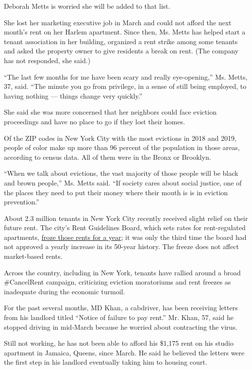 Deborah Metts is worried she will be added to that list.

She lost her marketing executive job in March and could not afford the
next month's rent on her Harlem apartment. Since then, Ms. Metts has
helped start a tenant association in her building, organized a rent
strike among some tenants and asked the property owner to give residents
a break on rent. (The company has not responded, she said.)

``The last few months for me have been scary and really eye-opening,''
Ms. Metts, 37, said. ``The minute you go from privilege, in a sense of
still being employed, to having nothing --- things change very
quickly.''

She said she was more concerned that her neighbors could face eviction
proceedings and have no place to go if they lost their homes.

Of the ZIP codes in New York City with the most evictions in 2018 and
2019, people of color make up more than 96 percent of the population in
those areas, according to census data. All of them were in the Bronx or
Brooklyn.

``When we talk about evictions, the vast majority of those people will
be black and brown people,'' Ms. Metts said. ``If society cares about
social justice, one of the places they need to put their money where
their mouth is is in eviction prevention.''

About 2.3 million tenants in New York City recently received slight
relief on their future rent. The city's Rent Guidelines Board, which
sets rates for rent-regulated apartments,
\href{https://www.nytimes.com/2020/06/17/nyregion/nyc-rent-guidelines-board-freeze.html}{froze
those rents for a year}; it was only the third time the board had not
approved a yearly increase in its 50-year history. The freeze does not
affect market-based rents.

Across the country, including in New York, tenants have rallied around a
broad \#CancelRent campaign, criticizing eviction moratoriums and rent
freezes as inadequate during the economic turmoil.

For the past several months, MD Khan, a cabdriver, has been receiving
letters from his landlord titled ``Notice of failure to pay rent.'' Mr.
Khan, 57, said he stopped driving in mid-March because he worried about
contracting the virus.

Still not working, he has not been able to afford his \$1,175 rent on
his studio apartment in Jamaica, Queens, since March. He said he
believed the letters were the first step in his landlord eventually
taking him to housing court.


